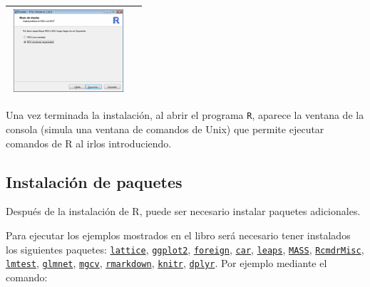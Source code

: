 \documentclass[]{book}
\begin{document}
\begin{longtable}[]{@{}cc@{}}
\includegraphics[width=0.95000\textwidth]{figuras/image6.png}\tabularnewline
\bottomrule
\end{longtable}

Una vez terminada la instalación, al abrir el programa \texttt{R},
aparece la ventana de la consola (simula una ventana de comandos de
Unix) que permite ejecutar comandos de R al irlos introduciendo.

\subsection{Instalación de paquetes}\label{instalacion-de-paquetes}

Después de la instalación de R, puede ser necesario instalar paquetes
adicionales.

Para ejecutar los ejemplos mostrados en el libro será necesario tener
instalados los siguientes paquetes:
\href{https://cran.r-project.org/web/packages/lattice/index.html}{\texttt{lattice}},
\href{https://cran.r-project.org/web/packages/ggplot2/index.html}{\texttt{ggplot2}},
\href{https://cran.r-project.org/web/packages/foreign/index.html}{\texttt{foreign}},
\href{https://cran.r-project.org/web/packages/car/index.html}{\texttt{car}},
\href{https://cran.r-project.org/web/packages/leaps/index.html}{\texttt{leaps}},
\href{https://cran.r-project.org/web/packages/MASS/index.html}{\texttt{MASS}},
\href{https://cran.r-project.org/web/packages/RcmdrMisc/index.html}{\texttt{RcmdrMisc}},
\href{https://cran.r-project.org/web/packages/lmtest/index.html}{\texttt{lmtest}},
\href{https://cran.r-project.org/web/packages/glmnet/index.html}{\texttt{glmnet}},
\href{https://cran.r-project.org/web/packages/mgcv/index.html}{\texttt{mgcv}},
\href{https://cran.r-project.org/web/packages/rmarkdown/index.html}{\texttt{rmarkdown}},
\href{https://cran.r-project.org/web/packages/knitr/index.html}{\texttt{knitr}},
\href{https://cran.r-project.org/web/packages/dplyr/index.html}{\texttt{dplyr}}.
Por ejemplo mediante el comando:
\end{document}
